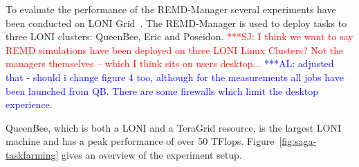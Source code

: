 \documentclass[times, 10pt, twocolumn]{article}
\newcommand{\alnote}[1]{ {\textcolor{blue} { ***AL: #1 }}}
\newcommand{\jhanote}[1]{ {\textcolor{red} { ***SJ: #1 }}}
\newcommand{\alnote}[1]{}
\newcommand{\jhanote}[1]{}
\newcommand{\up}{\vspace*{-1em}}
\begin{document}


%      
%  

\label{sec:exp}       
        
\up To evaluate the performance of the REMD-Manager several
experiments have been conducted on LONI Grid~\cite{Allen:2003xy}. The
REMD-Manager is used to deploy tasks to three LONI clusters: QueenBee,
Eric and Poseidon.  \jhanote{I think we want to say REMD simulations
  have been deployed on three LONI Linux Clusters? Not the managers
  themselves -- which I think sits on users desktop...}
\alnote{adjusted that - should i change figure 4 too, although for the
  measurements all jobs have been launched from QB. There are some
  firewalls which limit the desktop experience.}
 
QueenBee, which is both a LONI and a TeraGrid resource, is the largest LONI
machine and has a peak performance of over 50 TFlops.
Figure~\ref{fig:saga-taskfarming} gives an overview of the experiment
setup.
\end{document}
